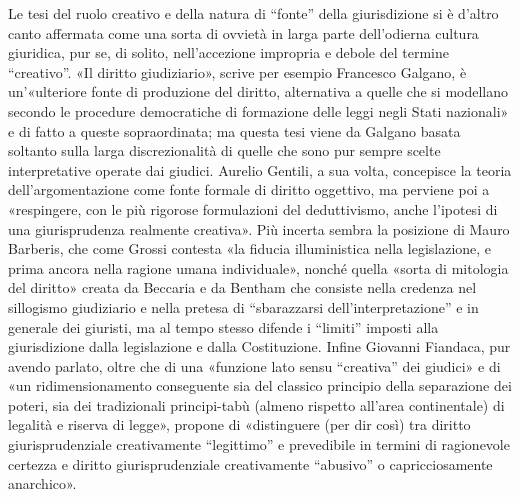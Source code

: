 Le tesi del ruolo creativo e della natura di “fonte” della giurisdizione si è d’altro canto affermata come una sorta di ovvietà in larga parte dell’odierna cultura giuridica, pur se, di solito, nell’accezione impropria e debole del termine “creativo”. «Il diritto giudiziario», scrive per esempio Francesco Galgano, è un’«ulteriore fonte di produzione del diritto, alternativa a quelle che si modellano secondo le procedure democratiche di formazione delle leggi negli Stati nazionali» e di fatto a queste sopraordinata; ma questa tesi viene da Galgano basata soltanto sulla larga discrezionalità di quelle che sono pur sempre scelte interpretative operate dai giudici. Aurelio Gentili, a sua volta, concepisce la teoria dell’argomentazione come fonte formale di diritto oggettivo, ma perviene poi a «respingere, con le più rigorose formulazioni del deduttivismo, anche l’ipotesi di una giurisprudenza realmente creativa». Più incerta sembra la posizione di Mauro Barberis, che come Grossi contesta «la fiducia illuministica nella legislazione, e prima ancora nella ragione umana individuale», nonché quella «sorta di mitologia del diritto» creata da Beccaria e da Bentham che consiste nella credenza nel sillogismo giudiziario e nella pretesa di “sbarazzarsi dell’interpretazione” e in generale dei giuristi, ma al tempo stesso difende i “limiti” imposti alla giurisdizione dalla legislazione e dalla Costituzione. Infine Giovanni Fiandaca, pur avendo parlato, oltre che di una «funzione lato sensu “creativa” dei giudici» e di «un ridimensionamento conseguente sia del classico principio della separazione dei poteri, sia dei tradizionali principi-tabù (almeno rispetto all’area continentale) di legalità e riserva di legge», propone di «distinguere (per dir così) tra diritto giurisprudenziale creativamente “legittimo” e prevedibile in termini di ragionevole certezza e diritto giurisprudenziale creativamente “abusivo” o capricciosamente anarchico».
